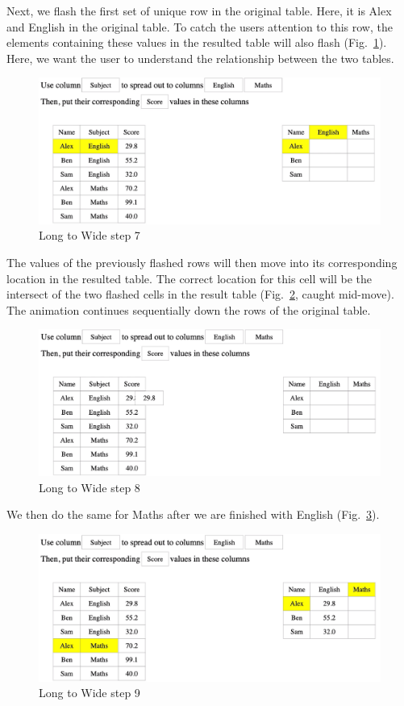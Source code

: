 Next, we flash the first set of unique row in the original table. Here, it is Alex and English in the original table. To catch the users attention to this row, the elements containing these values in the resulted table will also flash (Fig.~\ref{fig:spread7}). Here, we want the user to understand the relationship between the two tables. 
\begin{figure}[H]
    \includegraphics[scale = 0.35]{Masters-Thesis/img/spread7.png}
    \caption{Long to Wide step 7}
    \label{fig:spread7}
\end{figure}

\newpage
The values of the previously flashed rows will then move into its corresponding location in the resulted table. The correct location for this cell will be the intersect of the two flashed cells in the result table (Fig.~\ref{fig:spread8}, caught mid-move). The animation continues sequentially down the rows of the original table. 
\begin{figure}[H]
    \includegraphics[scale = 0.35]{Masters-Thesis/img/spread8.png}
    \caption{Long to Wide step 8}
    \label{fig:spread8}
\end{figure}

We then do the same for Maths after we are finished with English (Fig.~\ref{fig:spread9}).
\begin{figure}[H]
    \includegraphics[scale = 0.35]{Masters-Thesis/img/spread9.png}
    \caption{Long to Wide step 9}
    \label{fig:spread9}
\end{figure}

